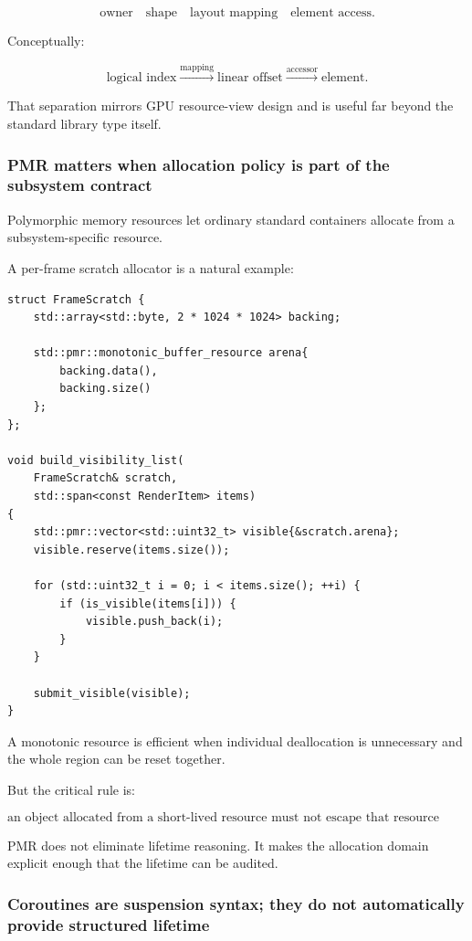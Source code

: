 \[
\text{owner}
\quad
\text{shape}
\quad
\text{layout mapping}
\quad
\text{element access}.
\]

Conceptually:

\[
\text{logical index}
\overset{\text{mapping}}{\longrightarrow}
\text{linear offset}
\overset{\text{accessor}}{\longrightarrow}
\text{element}.
\]

That separation mirrors GPU resource-view design and is useful far beyond the standard library type itself.

\subsubsection{PMR matters when allocation policy is part of the subsystem contract}\label{01-foundations-i-ch005-pmr-matters-when-allocation-policy-is-part-of-the-subsystem-contract}

Polymorphic memory resources let ordinary standard containers allocate from a subsystem-specific resource.

A per-frame scratch allocator is a natural example:

\begin{verbatim}
struct FrameScratch {
    std::array<std::byte, 2 * 1024 * 1024> backing;

    std::pmr::monotonic_buffer_resource arena{
        backing.data(),
        backing.size()
    };
};

void build_visibility_list(
    FrameScratch& scratch,
    std::span<const RenderItem> items)
{
    std::pmr::vector<std::uint32_t> visible{&scratch.arena};
    visible.reserve(items.size());

    for (std::uint32_t i = 0; i < items.size(); ++i) {
        if (is_visible(items[i])) {
            visible.push_back(i);
        }
    }

    submit_visible(visible);
}
\end{verbatim}

A monotonic resource is efficient when individual deallocation is unnecessary and the whole region can be reset together.

But the critical rule is:

\[
\boxed{
\text{an object allocated from a short-lived resource must not escape that resource lifetime}
}
\]

PMR does not eliminate lifetime reasoning. It makes the allocation domain explicit enough that the lifetime can be audited.

\subsubsection{Coroutines are suspension syntax; they do not automatically provide structured lifetime}\label{01-foundations-i-ch005-coroutines-are-suspension-syntax-they-do-not-automatically-provide-structured-lifetime}

